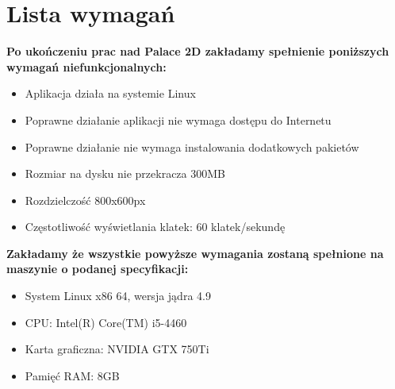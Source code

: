\documentclass{article}
\begin{document}
\section{Lista wymagań}
\textbf{Po ukończeniu prac nad Palace 2D zakładamy spełnienie poniższych 
wymagań niefunkcjonalnych:}
  \begin{itemize}
  \item Aplikacja działa na systemie Linux
  \item Poprawne działanie aplikacji nie wymaga dostępu do Internetu
  \item Poprawne działanie nie wymaga instalowania dodatkowych pakietów
  \item Rozmiar na dysku nie przekracza 300MB
  \item Rozdzielczość 800x600px
  \item Częstotliwość wyświetlania klatek: 60 klatek/sekundę
  \end{itemize}


\textbf{\newline Zakładamy że wszystkie powyższe wymagania zostaną 
spełnione na maszynie o podanej specyfikacji:}
\begin{itemize}
  \item System Linux x86 64, wersja jądra 4.9
  \item CPU: Intel(R) Core(TM) i5-4460
  \item Karta graficzna: NVIDIA GTX 750Ti
  \item Pamięć RAM: 8GB
\end{itemize}
\end{document}
